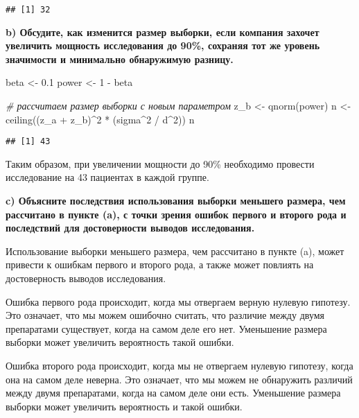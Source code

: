 \documentclass[
]{article}
\newenvironment{Shaded}{\begin{snugshade}}{\end{snugshade}}
\newcommand{\CommentTok}[1]{\textcolor[rgb]{0.56,0.35,0.01}{\textit{#1}}}
\newcommand{\DecValTok}[1]{\textcolor[rgb]{0.00,0.00,0.81}{#1}}
\newcommand{\FloatTok}[1]{\textcolor[rgb]{0.00,0.00,0.81}{#1}}
\newcommand{\FunctionTok}[1]{\textcolor[rgb]{0.00,0.00,0.00}{#1}}
\newcommand{\NormalTok}[1]{#1}
\newcommand{\OtherTok}[1]{\textcolor[rgb]{0.56,0.35,0.01}{#1}}
\newcommand{\SpecialCharTok}[1]{\textcolor[rgb]{0.00,0.00,0.00}{#1}}
\begin{document}
\begin{verbatim}
## [1] 32
\end{verbatim}

\textbf{b) Обсудите, как изменится размер выборки, если компания захочет
увеличить мощность исследования до 90\%, сохраняя тот же уровень
значимости и минимально обнаружимую разницу.}

\begin{Shaded}
\begin{Highlighting}[]
\NormalTok{beta }\OtherTok{\textless{}{-}} \FloatTok{0.1}
\NormalTok{power }\OtherTok{\textless{}{-}} \DecValTok{1} \SpecialCharTok{{-}}\NormalTok{ beta}

\CommentTok{\# рассчитаем размер выборки с новым параметром}
\NormalTok{z\_b }\OtherTok{\textless{}{-}} \FunctionTok{qnorm}\NormalTok{(power)}
\NormalTok{n }\OtherTok{\textless{}{-}} \FunctionTok{ceiling}\NormalTok{((z\_a }\SpecialCharTok{+}\NormalTok{ z\_b)}\SpecialCharTok{\^{}}\DecValTok{2} \SpecialCharTok{*}\NormalTok{  (sigma}\SpecialCharTok{\^{}}\DecValTok{2} \SpecialCharTok{/}\NormalTok{ d}\SpecialCharTok{\^{}}\DecValTok{2}\NormalTok{))}
\NormalTok{n}
\end{Highlighting}
\end{Shaded}

\begin{verbatim}
## [1] 43
\end{verbatim}

Таким образом, при увеличении мощности до 90\% необходимо провести
исследование на 43 пациентах в каждой группе.

\textbf{c) Объясните последствия использования выборки меньшего размера,
чем рассчитано в пункте (a), с точки зрения ошибок первого и второго
рода и последствий для достоверности выводов исследования.}

Использование выборки меньшего размера, чем рассчитано в пункте (a),
может привести к ошибкам первого и второго рода, а также может повлиять
на достоверность выводов исследования.

Ошибка первого рода происходит, когда мы отвергаем верную нулевую
гипотезу. Это означает, что мы можем ошибочно считать, что различие
между двумя препаратами существует, когда на самом деле его нет.
Уменьшение размера выборки может увеличить вероятность такой ошибки.

Ошибка второго рода происходит, когда мы не отвергаем нулевую гипотезу,
когда она на самом деле неверна. Это означает, что мы можем не
обнаружить различий между двумя препаратами, когда на самом деле они
есть. Уменьшение размера выборки может увеличить вероятность и такой
ошибки.
\end{document}
